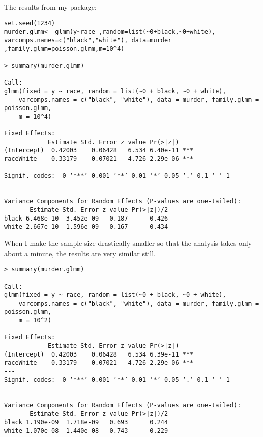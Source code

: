 \documentclass{article}
\begin{document}
The results from my package:

\begin{verbatim}
set.seed(1234)
murder.glmm<- glmm(y~race ,random=list(~0+black,~0+white), varcomps.names=c("black","white"), data=murder ,family.glmm=poisson.glmm,m=10^4)

> summary(murder.glmm)

Call:
glmm(fixed = y ~ race, random = list(~0 + black, ~0 + white), 
    varcomps.names = c("black", "white"), data = murder, family.glmm = poisson.glmm, 
    m = 10^4)

Fixed Effects:
            Estimate Std. Error z value Pr(>|z|)    
(Intercept)  0.42003    0.06428   6.534 6.40e-11 ***
raceWhite   -0.33179    0.07021  -4.726 2.29e-06 ***
---
Signif. codes:  0 ‘***’ 0.001 ‘**’ 0.01 ‘*’ 0.05 ‘.’ 0.1 ‘ ’ 1


Variance Components for Random Effects (P-values are one-tailed):
       Estimate Std. Error z value Pr(>|z|)/2
black 6.468e-10  3.452e-09   0.187      0.426
white 2.667e-10  1.596e-09   0.167      0.434
\end{verbatim}

When I make the sample size drastically smaller so that the analysis takes only about a minute, the results are very similar still.
\begin{verbatim}
> summary(murder.glmm)

Call:
glmm(fixed = y ~ race, random = list(~0 + black, ~0 + white), 
    varcomps.names = c("black", "white"), data = murder, family.glmm = poisson.glmm, 
    m = 10^2)

Fixed Effects:
            Estimate Std. Error z value Pr(>|z|)    
(Intercept)  0.42003    0.06428   6.534 6.39e-11 ***
raceWhite   -0.33179    0.07021  -4.726 2.29e-06 ***
---
Signif. codes:  0 ‘***’ 0.001 ‘**’ 0.01 ‘*’ 0.05 ‘.’ 0.1 ‘ ’ 1


Variance Components for Random Effects (P-values are one-tailed):
       Estimate Std. Error z value Pr(>|z|)/2
black 1.190e-09  1.718e-09   0.693      0.244
white 1.070e-08  1.440e-08   0.743      0.229

\end{verbatim}
\end{document}
